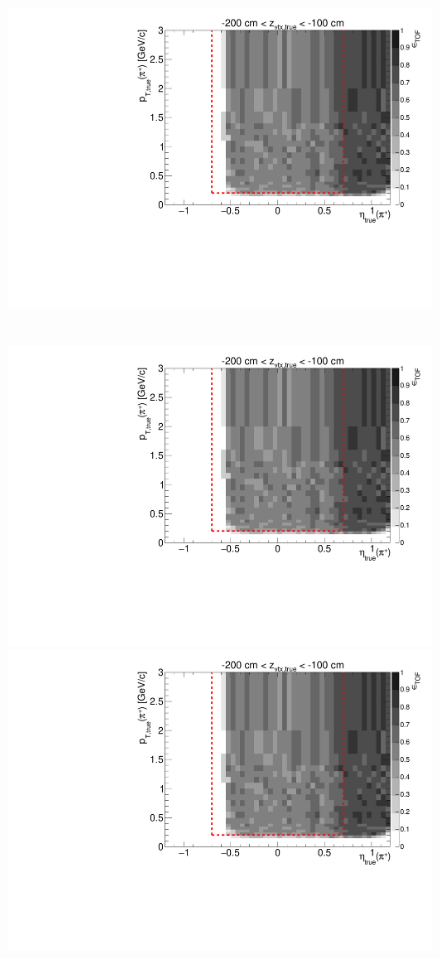 \begin{figure}[hb]
{  \includegraphics[width=\linewidth,page=17]{graphics/eff/Eff2D_TOF_pion_Plus.pdf}
}~
\parbox{0.495\textwidth}{
  \centering
  \includegraphics[width=\linewidth,page=12]{graphics/eff/Eff2D_TOF_pion_Plus.pdf}\\
  \includegraphics[width=\linewidth,page=14]{graphics/eff/Eff2D_TOF_pion_Plus.pdf}\\
}
\end{figure}
